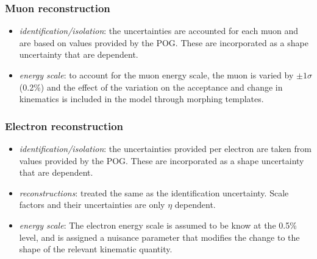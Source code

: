 \subsubsection{Muon reconstruction}
    \begin{itemize}
    \item \textit{identification/isolation}: the uncertainties are
        accounted for each muon and are based on values provided
        by the POG.  These are incorporated as a shape uncertainty that
        are \pt dependent.  
    \item \textit{energy scale}: to account for the muon energy scale,
        the muon \pt is varied by $\pm 1 \sigma$ (0.2\%) and the effect of
        the variation on the acceptance and change in kinematics is included
        in the model through morphing templates.
    \end{itemize}

\subsubsection{Electron reconstruction}
    \begin{itemize}
        \item \textit{identification/isolation}: the uncertainties
            provided per electron are taken from values provided by the
            POG.  These are incorporated as a shape uncertainty that are
            \pt dependent.
        \item \textit{reconstructions}: treated the same as the
            identification uncertainty.  Scale factors and their
            uncertainties are only $\eta$ dependent. 
        \item \textit{energy scale}: The electron energy scale is
            assumed to be know at the 0.5\% level, and is assigned a
            nuisance parameter that modifies the change to the shape of
            the relevant kinematic quantity.
    \end{itemize}

